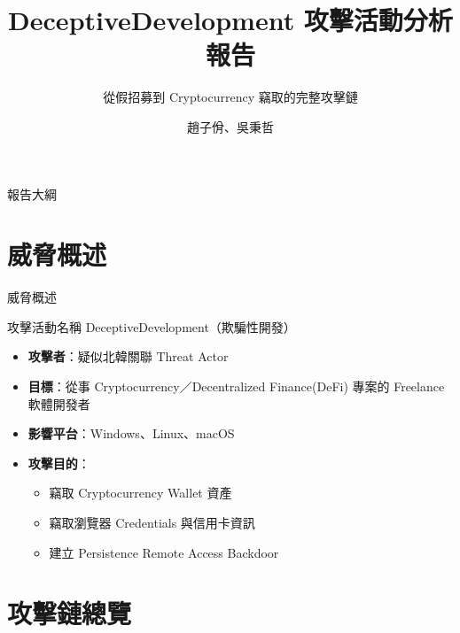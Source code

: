 \documentclass{beamer}
\title{DeceptiveDevelopment 攻擊活動分析報告}
\subtitle{從假招募到 Cryptocurrency 竊取的完整攻擊鏈}
\author{趙子佾、吳秉哲}
\date{}
\begin{document}
\begin{frame}
  \titlepage
\end{frame}

\begin{frame}{報告大綱}
  \tableofcontents
\end{frame}

\section{威脅概述}

\begin{frame}{威脅概述}
  \begin{block}{攻擊活動名稱}
    DeceptiveDevelopment（欺騙性開發）
  \end{block}
  \begin{itemize}
    \item \textbf{攻擊者}：疑似北韓關聯 Threat Actor
    \item \textbf{目標}：從事 Cryptocurrency／Decentralized Finance(DeFi) 專案的 Freelance 軟體開發者
    \item \textbf{影響平台}：Windows、Linux、macOS
    \item \textbf{攻擊目的}：
      \begin{itemize}
        \item 竊取 Cryptocurrency Wallet 資產
        \item 竊取瀏覽器 Credentials 與信用卡資訊
        \item 建立 Persistence Remote Access Backdoor
      \end{itemize}
  \end{itemize}
\end{frame}

\section{攻擊鏈總覽}
\end{document}
